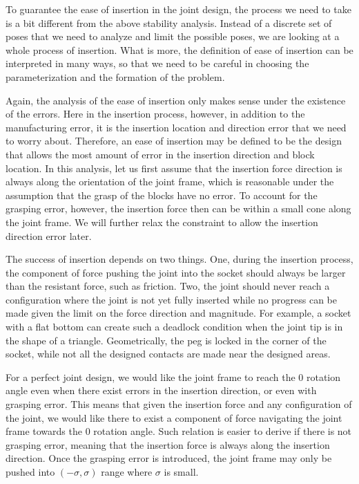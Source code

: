 To guarantee the ease of insertion in the joint design, the process we need to take is a bit different from the above stability analysis. Instead of a discrete set of poses that we need to analyze and limit the possible poses, we are looking at a whole process of insertion. What is more, the definition of ease of insertion can be interpreted in many ways, so that we need to be careful in choosing the parameterization and the formation of the problem. 

Again, the analysis of the ease of insertion only makes sense under the existence of the errors. Here in the insertion process, however, in addition to the manufacturing error, it is the insertion location and direction error that we need to worry about. Therefore, an ease of insertion may be defined to be the design that allows the most amount of error in the insertion direction and block location. In this analysis, let us first assume that the insertion force direction is always along the orientation of the joint frame, which is reasonable under the assumption that the grasp of the blocks have no error. To account for the grasping error, however, the insertion force then can be within a small cone along the joint frame. We will further relax the constraint to allow the insertion direction error later. 

The success of insertion depends on two things. One, during the insertion process, the component of force pushing the joint into the socket should always be larger than the resistant force, such as friction. Two, the joint should never reach a configuration where the joint is not yet fully inserted while no progress can be made given the limit on the force direction and magnitude. For example, a socket with a flat bottom can create such a deadlock condition when the joint tip is in the shape of a triangle. Geometrically, the peg is locked in the corner of the socket, while not all the designed contacts are made near the designed areas. 

For a perfect joint design, we would like the joint frame to reach the $0$ rotation angle even when there exist errors in the insertion direction, or even with grasping error. This means that given the insertion force and any configuration of the joint, we would like there to exist a component of force navigating the joint frame towards the $0$ rotation angle. Such relation is easier to derive if there is not grasping error, meaning that the insertion force is always along the insertion direction. Once the grasping error is introduced, the joint frame may only be pushed into $(-\sigma, \sigma)$ range where $\sigma$ is small. 

